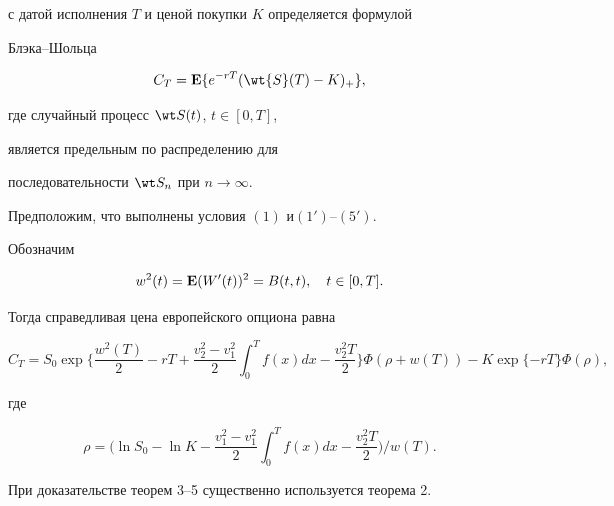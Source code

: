 с датой исполнения $T$ и ценой покупки $K$ определяется формулой


Блэка--Шольца


$$


C_T={\E}\{ {e^{-rT}(\wt{S}(T) -K)_{+}}\} ,


$$


где случайный процесс $\wt S(t)$, $t\in [0, T]$,


является предельным по распределению для


последовательности $\wt S_n$ при $n\to\infty$.








\begin{thm}


Предположим, что выполнены условия $(1)$ и\linebreak $(1')$--$(5')$.


Обозначим


$$


w^2(t)={\bold E}(W'(t))^2=B(t,t),\quad t\in [0,T].


$$


Тогда справедливая цена европейского опциона равна


$$


C_T=S_0\exp\bigg\{{\frac{w^2(T)}{2}-rT+\frac{v^2_2-v^2_1}{2}


\int_{0}^{T} f(x)dx-\frac{v_2^2T}{2}} \bigg\}


\Phi(\rho + w(T))-K\exp\{ {-rT}\} \Phi(\rho),


$$


где


$$


\rho=\bigg(\ln S_0-\ln K -\frac{v^2_1-v^2_1}{2}\int_0^T


f(x)dx-\frac{v_2^2T}{2}\bigg)\Big/ w(T).


$$


\end{thm}





При доказательстве теорем 3--5 существенно используется теорема 2.





